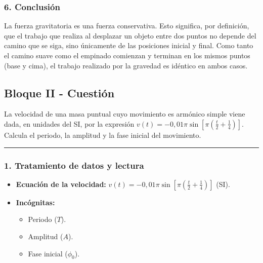 \subsubsection*{6. Conclusión}
\begin{cajaconclusion}
La fuerza gravitatoria es una fuerza conservativa. Esto significa, por definición, que el trabajo que realiza al desplazar un objeto entre dos puntos no depende del camino que se siga, sino únicamente de las posiciones inicial y final. Como tanto el camino suave como el empinado comienzan y terminan en los mismos puntos (base y cima), el trabajo realizado por la gravedad es idéntico en ambos casos.
\end{cajaconclusion}

\newpage
\subsection{Bloque II - Cuestión}
\label{subsec:II_B_2013_jun_ord}

\begin{cajaenunciado}
La velocidad de una masa puntual cuyo movimiento es armónico simple viene dada, en unidades del SI, por la expresión $v(t)=-0,01\pi \sin[\pi(\frac{t}{2}+\frac{1}{4})]$. Calcula el periodo, la amplitud y la fase inicial del movimiento.
\end{cajaenunciado}
\hrule

\subsubsection*{1. Tratamiento de datos y lectura}
\begin{itemize}
    \item \textbf{Ecuación de la velocidad:} $v(t)=-0,01\pi \sin[\pi(\frac{t}{2}+\frac{1}{4})]$ (SI).
    \item \textbf{Incógnitas:}
    \begin{itemize}
        \item Periodo ($T$).
        \item Amplitud ($A$).
        \item Fase inicial ($\phi_0$).
    \end{itemize}
\end{itemize}

